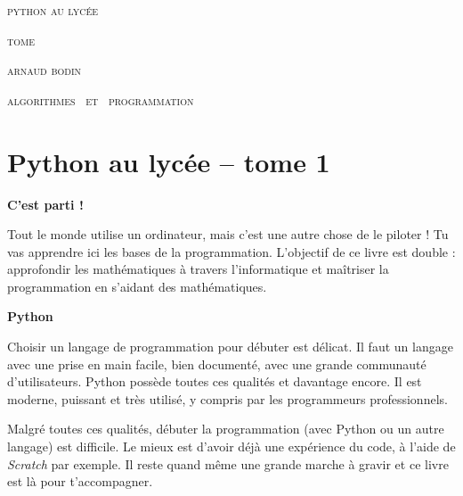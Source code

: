 
\pagestyle{empty}\thispagestyle{empty}
\vspace*{\fill}
\vspace*{5ex}
\begin{center}
\fontsize{40}{40}\selectfont
\textsc{python au lycée}

\vspace*{-0.5ex}
\textsc{\fontsize{24}{24}\selectfont tome \fontsize{22}{22}}

\vspace*{2ex}

\Large
\textsc{arnaud bodin}

\end{center}
\vfill
\begin{center}
\Large
\textsc{algorithmes \  et \  programmation}
\end{center}
\begin{center}
\end{center}

\clearpage

\thispagestyle{empty}

\vspace*{\fill}
\section*{Python au lycée -- tome 1}

{\large\textbf{C'est parti !}}

Tout le monde utilise un ordinateur, mais c'est une autre chose de le piloter ! Tu vas apprendre ici les bases de la programmation.  L'objectif de ce livre est double :  approfondir les mathématiques à travers l'informatique et maîtriser la programmation en s'aidant des mathématiques. 

\bigskip

{\large\textbf{Python}}

Choisir un langage de programmation pour débuter est délicat. Il faut un langage avec une prise en main facile, bien documenté, avec une grande communauté d'utilisateurs. Python possède toutes ces qualités et davantage encore. Il est moderne, puissant et très utilisé, y compris par les programmeurs professionnels. 

Malgré toutes ces qualités, débuter la programmation (avec Python ou un autre langage) est difficile. Le mieux est d'avoir déjà une expérience du code, à l'aide de \emph{Scratch} par exemple. Il reste quand même une grande marche à gravir et ce livre est là pour t'accompagner.

